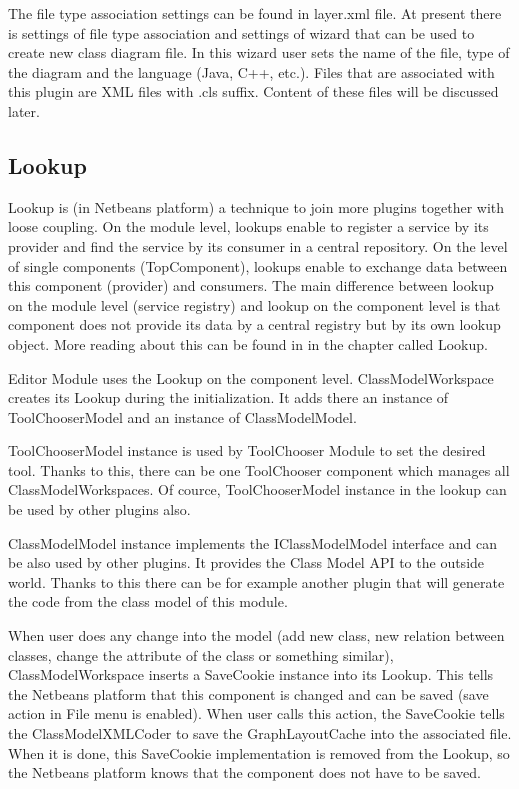 The file type association settings can be found in layer.xml file. At present there is settings of file type association and settings of wizard that can be used to create new class diagram file. In this wizard user sets the name of the file, type of the diagram and the language (Java, C++, etc.). Files that are associated with this plugin are XML files with .cls suffix. Content of these files will be discussed later.

\subsection{Lookup}
\label{subsection:lookup}

Lookup is (in Netbeans platform) a technique to join more plugins together with loose coupling. On the module level, lookups enable to register a service by its provider and find the service by its consumer in a central repository. On the level of single components (TopComponent), lookups enable to exchange data between this component (provider) and consumers. The main difference between lookup on the module level (service registry) and lookup on the component level is that component does not provide its data by a central registry but by its own lookup object. More reading about this can be found in \cite{netbeans6.9DevGuide} in the chapter called Lookup.

Editor Module uses the Lookup on the component level. ClassModelWorkspace creates its Lookup during the initialization. It adds there an instance of ToolChooserModel and an instance of ClassModelModel.

ToolChooserModel instance is used by ToolChooser Module to set the desired tool. Thanks to this, there can be one ToolChooser component which manages all ClassModelWorkspaces. Of cource, ToolChooserModel instance in the lookup can be used by other plugins also.

ClassModelModel instance implements the IClassModelModel interface and can be also used by other plugins. It provides the Class Model API to the outside world. Thanks to this there can be for example another plugin that will generate the code from the class model of this module.

When user does any change into the model (add new class, new relation between classes, change the attribute of the class or something similar), ClassModelWorkspace inserts a SaveCookie instance into its Lookup. This tells the Netbeans platform that this component is changed and can be saved (save action in File menu is enabled). When user calls this action, the SaveCookie tells the ClassModelXMLCoder to save the GraphLayoutCache into the associated file. When it is done, this SaveCookie implementation is removed from the Lookup, so the Netbeans platform knows that the component does not have to be saved.

